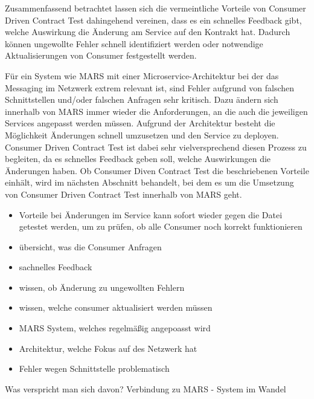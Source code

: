 \documentclass{llncs}
\begin{document}
Zusammenfassend betrachtet lassen sich die vermeintliche Vorteile von Consumer Driven Contract Test dahingehend vereinen, dass es ein schnelles Feedback gibt, welche Auswirkung die Änderung am Service auf den Kontrakt hat. Dadurch können ungewollte Fehler schnell identifiziert werden oder notwendige Aktualisierungen von Consumer festgestellt werden.

Für ein System wie MARS mit einer Microservice-Architektur bei der das Messaging im Netzwerk extrem relevant ist, sind Fehler aufgrund von falschen Schnittstellen und/oder falschen Anfragen sehr kritisch. Dazu ändern sich innerhalb von MARS immer wieder die Anforderungen, an die auch die jeweiligen Services angepasst werden müssen. Aufgrund der Architektur besteht die Möglichkeit Änderungen schnell umzusetzen und den Service zu deployen. Consumer Driven Contract Test ist dabei sehr vielversprechend diesen Prozess zu begleiten, da es schnelles Feedback geben soll, welche Auswirkungen die Änderungen haben. Ob Consumer Diven Contract Test die beschriebenen Vorteile einhält, wird im nächsten Abschnitt behandelt, bei dem es um die Umsetzung von Consumer Driven Contract Test innerhalb von MARS geht.

\begin{itemize}
\item Vorteile bei Änderungen im Service kann sofort wieder gegen die Datei getestet werden, um zu prüfen, ob alle Consumer noch korrekt funktionieren
\item übersicht, was die Consumer Anfragen
\item sachnelles Feedback
\item wissen, ob Änderung zu ungewollten Fehlern
\item wissen, welche consumer aktualisiert werden müssen
\item MARS System, welches regelmäßig angepoasst wird
\item Architektur, welche Fokus auf des Netzwerk hat
\item Fehler wegen Schnittstelle problematisch
\end{itemize}
Was verspricht man sich davon?
Verbindung zu MARS - System im Wandel
\end{document}
